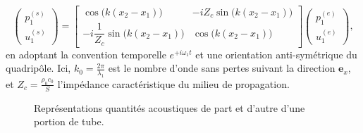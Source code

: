 \begin{equation}
    \begin{pmatrix}
        p_1^{(s)}\\
        u_1^{(s)}
    \end{pmatrix}=\begin{bmatrix}
        \cos\big(k(x_2-x_1)\big) & - i Z_c \sin\big(k(x_2-x_1)\big)\\
        - i \dfrac{1}{Z_c} \sin\big(k(x_2-x_1)\big) & \cos\big(k(x_2-x_1)\big)
    \end{bmatrix}\begin{pmatrix}
        p_1^{(e)}\\
        u_1^{(e)}
    \end{pmatrix},
    \label{eq:TMatrixCosSin}
\end{equation}
en adoptant la convention temporelle $e^{+i\omega_1 t}$ et une orientation anti-symétrique du quadripôle. Ici, $k_0 = \frac{2\pi}{\lambda_1}$ est le nombre d'onde sans pertes suivant la direction $\mathbf e_x$, et $Z_c = \frac{\rho_0 c_0}{S}$ l'impédance caractéristique du milieu de propagation. 

\begin{figure}[!ht]
    \centering
    
    \caption{Représentations quantités acoustiques de part et d'autre d'une portion de tube.}%
    \label{fig:WavesInDuctPiece}
\end{figure}



